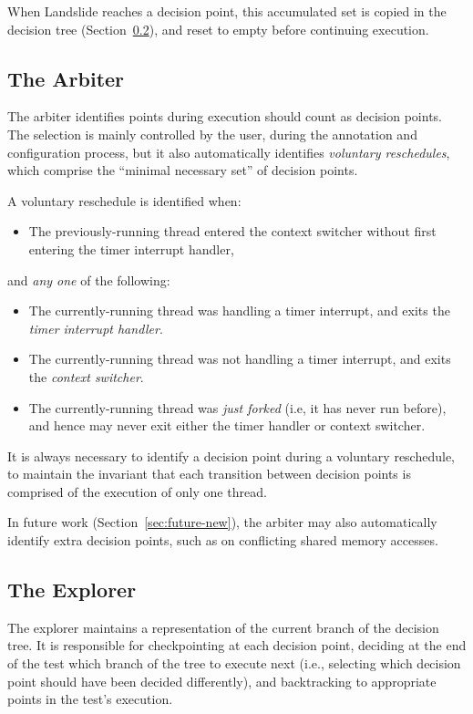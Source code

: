 When Landslide reaches a decision point, this accumulated set is copied in the decision tree (Section~\ref{sec:components-explore}), and reset to empty before continuing execution.

\subsection{The Arbiter}
\label{sec:components-arbiter}

The arbiter identifies points during execution should count as decision points. The selection is mainly controlled by the user, during the annotation and configuration process, but it also automatically identifies {\em voluntary reschedules}, which comprise the ``minimal necessary set'' of decision points.

A voluntary reschedule is identified when:
\begin{itemize}
	\item The previously-running thread entered the context switcher without first entering the timer interrupt handler,
\end{itemize}

and {\em any one} of the following:
\begin{itemize}
	\item The currently-running thread was handling a timer interrupt, and exits the {\em timer interrupt handler}.
	\item The currently-running thread was not handling a timer interrupt, and exits the {\em context switcher}.
	\item The currently-running thread was {\em just forked} (i.e, it has never run before), and hence may never exit either the timer handler or context switcher.
\end{itemize}

It is always necessary to identify a decision point during a voluntary reschedule, to maintain the invariant that each transition between decision points is comprised of the execution of only one thread.

In future work (Section~\ref{sec:future-new}), the arbiter may also automatically identify extra decision points, such as on conflicting shared memory accesses.

\subsection{The Explorer}
\label{sec:components-explore}

The explorer maintains a representation of the current branch of the decision tree. It is responsible for checkpointing at each decision point, deciding at the end of the test which branch of the tree to execute next (i.e., selecting which decision point should have been decided differently), and backtracking to appropriate points in the test's execution.

